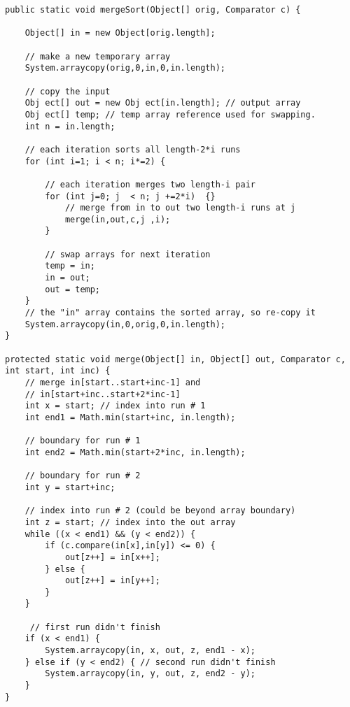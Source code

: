 \begin{lstlisting}[caption=Nicht Rekursiver Merge Sort]
public static void mergeSort(Object[] orig, Comparator c) {

	Object[] in = new Object[orig.length];

	// make a new temporary array
	System.arraycopy(orig,0,in,0,in.length);

	// copy the input
	Obj ect[] out = new Obj ect[in.length]; // output array
	Obj ect[] temp; // temp array reference used for swapping.
	int n = in.length;

	// each iteration sorts all length-2*i runs
	for (int i=1; i < n; i*=2) {

		// each iteration merges two length-i pair
		for (int j=0; j  < n; j +=2*i)  {}
			// merge from in to out two length-i runs at j
			merge(in,out,c,j ,i);
		}

		// swap arrays for next iteration
		temp = in;
		in = out;
		out = temp;
	}
	// the "in" array contains the sorted array, so re-copy it
	System.arraycopy(in,0,orig,0,in.length);
}

protected static void merge(Object[] in, Object[] out, Comparator c, int start, int inc) {
	// merge in[start..start+inc-1] and
	// in[start+inc..start+2*inc-1]
	int x = start; // index into run # 1
	int end1 = Math.min(start+inc, in.length);

	// boundary for run # 1
	int end2 = Math.min(start+2*inc, in.length);

	// boundary for run # 2
	int y = start+inc;

	// index into run # 2 (could be beyond array boundary)
	int z = start; // index into the out array
	while ((x < end1) && (y < end2)) {
		if (c.compare(in[x],in[y]) <= 0) {
			out[z++] = in[x++];
		} else {
			out[z++] = in[y++];
		}
	}

	 // first run didn't finish
	if (x < end1) {
		System.arraycopy(in, x, out, z, end1 - x);
	} else if (y < end2) { // second run didn't finish
		System.arraycopy(in, y, out, z, end2 - y);
	}
}
\end{lstlisting}

